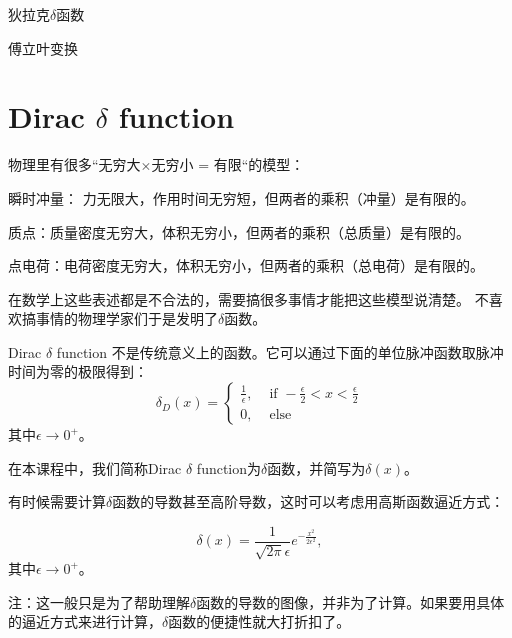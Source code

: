 \documentclass[CJK]{beamer}
\date{}
\begin{document}


\begin{frame}
\bch
\bitem
\item{狄拉克$\delta$函数}
\item{傅立叶变换}
\eitem
\ech
\end{frame}

\section{Dirac $\delta$ function}

\begin{frame}
  \bch
  物理里有很多“无穷大$\times$无穷小 = 有限“的模型：
  \bitem
\item{瞬时冲量： 力无限大，作用时间无穷短，但两者的乘积（冲量）是有限的。}
\item{质点：质量密度无穷大，体积无穷小，但两者的乘积（总质量）是有限的。}
\item{点电荷：电荷密度无穷大，体积无穷小，但两者的乘积（总电荷）是有限的。}
  \eitem

  \skiplines
  
  在数学上这些表述都是不合法的，需要搞很多事情才能把这些模型说清楚。 不喜欢搞事情的物理学家们于是发明了$\delta$函数。
  \ech
\end{frame}

\begin{frame}
  \bch
  \emini
  Dirac $\delta$ function 不是传统意义上的函数。它可以通过下面的{\blue 单位脉冲函数取脉冲时间为零的极限}得到：
  $$\delta_D(x) = \left\{\begin{array}{ll} \frac{1}{\epsilon}, & \text{ if } -\frac{\epsilon}{2}<x<\frac{\epsilon}{2} \\  0, & \text{ else}\end{array}\right. $$
  其中$\epsilon\rightarrow 0^+$。  
  \emini

  在本课程中，我们{\blue 简称Dirac $\delta$ function为$\delta$函数，并简写为$\delta(x)$}。
  \ech
\end{frame}


\begin{frame}
  \bch
  有时候需要计算$\delta$函数的导数甚至高阶导数，这时可以考虑用高斯函数逼近方式：

  $$\delta(x) = \frac{1}{\sqrt{2\pi}\epsilon}e^{-\frac{x^2}{2\epsilon^2}},$$
  其中$\epsilon\rightarrow 0^+$。

  \skiplines
  

  {\scriptsize 注：这一般只是为了帮助理解$\delta$函数的导数的图像，并非为了计算。如果要用具体的逼近方式来进行计算，$\delta$函数的便捷性就大打折扣了。}
  \ech
\end{frame}
\end{document}
